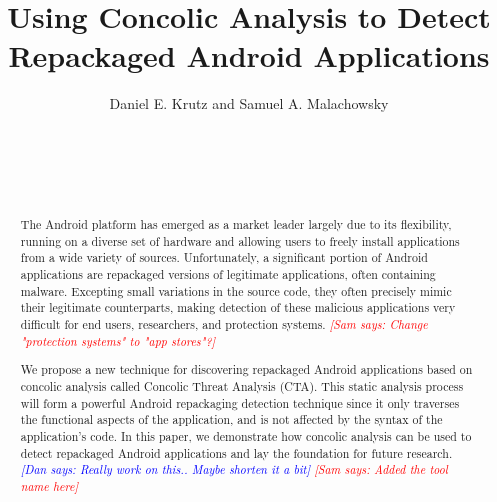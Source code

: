 \documentclass{sig-alternate}
\newcommand{\sam}[1]{\textcolor{red}{{\it [Sam says: #1]}}}
\newcommand{\dan}[1]{\textcolor{blue}{{\it [Dan says: #1]}}}
\begin{document}
%

\title{Using Concolic Analysis to Detect Repackaged Android Applications}
%
\author{
%
\alignauthor
Daniel E. Krutz and Samuel A. Malachowsky\\ 	
	\\
       \\
       \\
        \\
} %


\maketitle
\begin{abstract}

The Android platform has emerged as a market leader largely due to its flexibility, running on a diverse set of hardware and allowing users to freely install applications from a wide variety of sources. Unfortunately, a significant portion of Android applications are repackaged versions of legitimate applications, often containing malware. Excepting small variations in the source code, they often precisely mimic their legitimate counterparts, making detection of these malicious applications very difficult for end users, researchers, and protection systems. \sam{Change "protection systems" to "app stores"?}

We propose a new technique for discovering repackaged Android applications based on concolic analysis called Concolic Threat Analysis (CTA). This static analysis process will form a powerful Android repackaging detection technique since it only traverses the functional aspects of the application, and is not affected by the syntax of the application's code. In this paper, we demonstrate how concolic analysis can be used to detect repackaged Android applications and lay the foundation for future research.
\dan{Really work on this.. Maybe shorten it a bit}
\sam{Added the tool name here}

\end{abstract}
\end{document}
